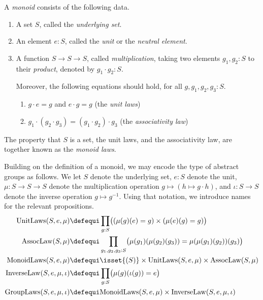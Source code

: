 \begin{definition}\label{def:monoid}
  A \emph{monoid} consists of the following data.
  \begin{enumerate}
  \item\label{struc:monoid-set} A set $S$, called the \emph{underlying set}.
  \item\label{struc:monoid-unit} An element $e:S$, called the \emph{unit} or the \emph{neutral element}.
  \item\label{struc:monoid-mult} A function $S\to S\to S$, called \emph{multiplication},
    taking two elements $g_1,g_2:S$ to their \emph{product}, denoted by $g_1\cdot g_2:S$.
    \par \noindent
    Moreover, the following equations should hold, for all $g,g_1,g_2,g_3 : S$.
    \begin{enumerate}[label=(\alph*),ref=\ref{struc:monoid-mult} (\alph*)]
    \item\label{monoid:unit-laws} $g\cdot e=g$ and $e\cdot g=g$ (the \emph{unit laws})
    \item\label{monoid:ass-law} $g_1\cdot(g_2\cdot g_3)=(g_1\cdot g_2)\cdot g_3$ 
         (the \emph{associativity law})
    \end{enumerate}
  \end{enumerate}
 The property that $S$ is a set, the
  unit laws, and the associativity law, are together known as the \emph{monoid laws}.
\end{definition}


  Building on the definition of a monoid, we may encode the type of abstract 
  groups as follows. We let $S$ denote the underlying set, $e : S$ denote the unit, 
  $\mu:S\to S\to S$ denote the multiplication operation 
  $g\mapsto (h \mapsto g\cdot h)$, and $\iota : S \to S$ denote 
  the inverse operation $g \mapsto g^{-1}$.  Using
  that notation, we introduce names for the relevant propositions.
  \begin{align*}
    \mathrm{UnitLaws}(S,e,\mu)   & \defequi
    \prod_{g:S} \bigl((\mu{}(g)(e) = g)\times(\mu{}(e)(g) = g) \bigr)\\
    \mathrm{AssocLaw}(S,\mu{})   & \defequi\prod_{g_1,g_2,g_3:S} 
    \bigl( \mu{}(g_1)(\mu{}(g_2)(g_3))=\mu{}(\mu{}(g_1)(g_2))(g_3) \bigr)\\
    \mathrm{MonoidLaws}(S,e,\mu) & \defequi \isset{(S)} 
    \times \mathrm{UnitLaws}(S,e,\mu) \times \mathrm{AssocLaw}(S,\mu{}) \\
    \mathrm{InverseLaw}(S,e,\mu,\iota) & \defequi 
    \prod_{g:S}\bigl( \mu(g)(\iota(g)) = e \bigr) \\
    \mathrm{GroupLaws}(S,e,\mu,\iota) & \defequi 
    \mathrm{MonoidLaws}(S,e,\mu) \times \mathrm{InverseLaw}(S,e,\mu,\iota)
  \end{align*}

